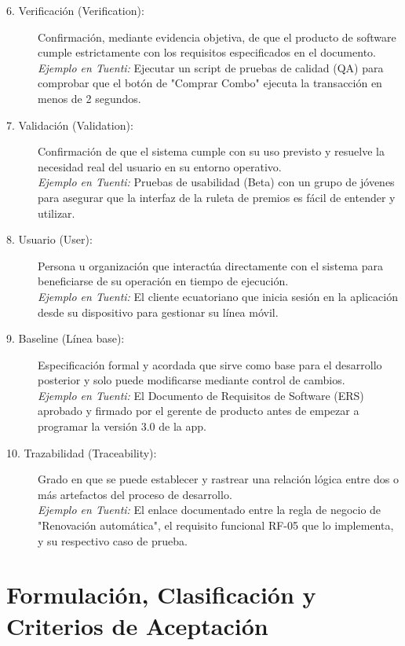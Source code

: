 \documentclass[12pt,a4paper]{article}
\begin{document}
\begin{description}
    \item[6. Verificación (Verification):] Confirmación, mediante evidencia objetiva, de que el producto de software cumple estrictamente con los requisitos especificados en el documento. \\
    \textit{Ejemplo en Tuenti:} Ejecutar un script de pruebas de calidad (QA) para comprobar que el botón de "Comprar Combo" ejecuta la transacción en menos de 2 segundos.

    \item[7. Validación (Validation):] Confirmación de que el sistema cumple con su uso previsto y resuelve la necesidad real del usuario en su entorno operativo. \\
    \textit{Ejemplo en Tuenti:} Pruebas de usabilidad (Beta) con un grupo de jóvenes para asegurar que la interfaz de la ruleta de premios es fácil de entender y utilizar.

    \item[8. Usuario (User):] Persona u organización que interactúa directamente con el sistema para beneficiarse de su operación en tiempo de ejecución. \\
    \textit{Ejemplo en Tuenti:} El cliente ecuatoriano que inicia sesión en la aplicación desde su dispositivo para gestionar su línea móvil.

    \item[9. Baseline (Línea base):] Especificación formal y acordada que sirve como base para el desarrollo posterior y solo puede modificarse mediante control de cambios. \\
    \textit{Ejemplo en Tuenti:} El Documento de Requisitos de Software (ERS) aprobado y firmado por el gerente de producto antes de empezar a programar la versión 3.0 de la app.

    \item[10. Trazabilidad (Traceability):] Grado en que se puede establecer y rastrear una relación lógica entre dos o más artefactos del proceso de desarrollo. \\
    \textit{Ejemplo en Tuenti:} El enlace documentado entre la regla de negocio de "Renovación automática", el requisito funcional RF-05 que lo implementa, y su respectivo caso de prueba.
\end{description}

\section{Formulación, Clasificación y Criterios de Aceptación}
\end{document}
